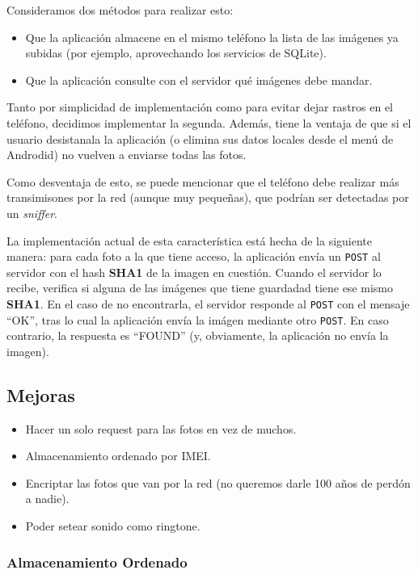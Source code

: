 Consideramos dos métodos para realizar esto:
\begin{itemize}
	\item Que la aplicación almacene en el mismo teléfono la lista de las imágenes ya subidas (por ejemplo, aprovechando los servicios de SQLite).
	\item Que la aplicación consulte con el servidor qué imágenes debe mandar. 
\end{itemize}

Tanto por simplicidad de implementación como para evitar dejar rastros en el teléfono, decidimos implementar la segunda. Además, tiene la ventaja de que si el usuario desistanala la aplicación (o elimina sus datos locales desde el menú de Androdid) no vuelven a enviarse todas las fotos. 

Como desventaja de esto, se puede mencionar que el teléfono debe realizar más transimisones por la red (aunque muy pequeñas), que podrían ser detectadas por un \emph{sniffer}.


La implementación actual de esta característica está hecha de la siguiente manera: para cada foto a la que tiene acceso, la aplicación envía un \texttt{POST} al servidor con el hash \textbf{SHA1} de la imagen en cuestión. Cuando el servidor lo recibe, verifica si alguna de las imágenes que tiene guardadad tiene ese mismo \textbf{SHA1}. En el caso de no encontrarla, el servidor responde al \texttt{POST} con el mensaje ``OK'', tras lo cual la aplicación envía la imágen mediante otro \texttt{POST}.
En caso contrario, la respuesta es ``FOUND'' (y, obviamente, la aplicación no envía la imagen).

\subsection{Mejoras} %
\label{ssub:Mejoras}
\begin{itemize}
	\item Hacer un solo request para las fotos en vez de muchos.
	\item Almacenamiento ordenado por IMEI.
	\item Encriptar las fotos que van por la red (no queremos darle 100 años de perdón a nadie).
	\item Poder setear sonido como ringtone.
\end{itemize}


\subsubsection{Almacenamiento Ordenado} %
\label{ssub:almacenamiento_ordenado}

